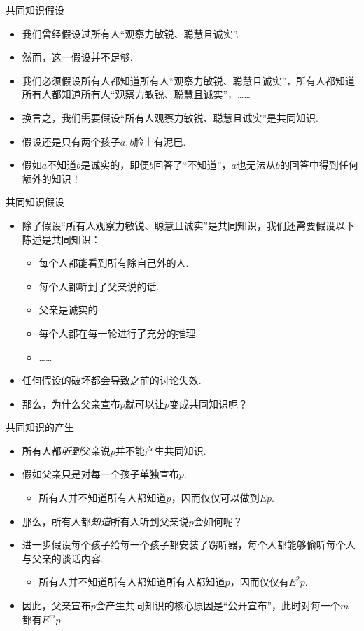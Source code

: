 \begin{frame}{共同知识假设}
\begin{itemize}
    \item 我们曾经假设过所有人“观察力敏锐、聪慧且诚实”.
    \item 然而，这一假设并不足够.
    \item 我们必须假设所有人都知道所有人“观察力敏锐、聪慧且诚实”，所有人都知道所有人都知道所有人“观察力敏锐、聪慧且诚实”，……
    \item 换言之，我们需要假设“所有人观察力敏锐、聪慧且诚实”是共同知识.
    \item 假设还是只有两个孩子$a,b$脸上有泥巴.
    \item 假如$a$不知道$b$是诚实的，即便$b$回答了“不知道”，$a$也无法从$b$的回答中得到任何额外的知识！
\end{itemize}
\end{frame}

\begin{frame}{共同知识假设}
\begin{itemize}
    \item 除了假设“所有人观察力敏锐、聪慧且诚实”是共同知识，我们还需要假设以下陈述是共同知识：
    \begin{itemize}
        \item 每个人都能看到所有除自己外的人.
        \item 每个人都听到了父亲说的话.
        \item 父亲是诚实的.
        \item 每个人都在每一轮进行了充分的推理.
        \item ……
    \end{itemize}
    \item 任何假设的破坏都会导致之前的讨论失效.
    \item 那么，为什么父亲宣布$p$就可以让$p$变成共同知识呢？
\end{itemize}
\end{frame}

\begin{frame}{共同知识的产生}
\begin{itemize}
    \item 所有人都\emph{听到}父亲说$p$并不能产生共同知识.
    \item 假如父亲只是对每一个孩子单独宣布$p$.
    \begin{itemize}
        \item 所有人并不知道所有人都知道$p$，因而仅仅可以做到$E p$.
    \end{itemize}
    \item 那么，所有人都\emph{知道}所有人听到父亲说$p$会如何呢？
    \item 进一步假设每个孩子给每一个孩子都安装了窃听器，每个人都能够偷听每个人与父亲的谈话内容.
    \begin{itemize}
        \item 所有人并不知道所有人都知道所有人都知道$p$，因而仅仅有$E^2 p$.
    \end{itemize}
    \item 因此，父亲宣布$p$会产生共同知识的核心原因是“公开宣布”，此时对每一个$m$都有$E^m p$.
\end{itemize}
\end{frame}

